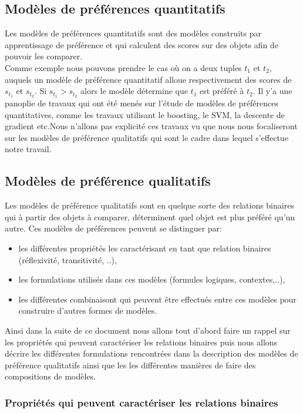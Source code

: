 \documentclass[a4paper,12pt,openany,oneside]{article}
\begin{document}
\subsection{Modèles de préférences quantitatifs} 
Les modèles de préférences quantitatifs sont des modèles construits par apprentissage de préférence et qui calculent des scores sur des objets afin de pouvoir les comparer. \\
Comme exemple nous pouvons prendre le cas où on a deux tuples $t_1$ et $t_2$, auquels un modèle de préférence quantitatif alloue respectivement des scores de $s_{t_1}$ et $s_{t_2}$. Si $s_{t_1}>s_{t_2}$ alors le modèle détermine que $t_1$ est préféré à $t_2$.
Il y'a une panoplie de travaux qui ont été menés sur l'étude de modèles de préférences quantitatives, comme les travaux utilisant le boosting, le SVM, la descente de gradient etc.Nous n'allons pas explicité ces travaux vu que nous nous focaliseront sur les modèles de préférence qualitatifs qui sont le cadre dans lequel s'effectue notre travail.

\subsection{Modèles de préférence qualitatifs}
Les modèles de préférence qualitatifs sont en quelque sorte des relations binaires qui à partir des objets à comparer, déterminent quel objet est plus préféré qu'un autre. Ces modèles de préférences peuvent se distinguer par:
\begin{itemize}
\item les différentes propriétés les caractérisant en tant que relation binaires (réflexivité, transitivité, ..),
\item  les formulations utilisés dans ces modèles (formules logiques, contextes,..),
\item  les différentes combinaisont qui peuvent être effectués entre ces modèles pour construire d'autres formes de modèles.\\
\end{itemize}
 Ainsi dans la suite de ce document nous allons tout d'abord faire un rappel sur les propriétés qui peuvent caractériser les relations binaires puis nous allons décrire les différentes formulations rencontrées dans la description des modèles de préférence qualitatifs ainsi que les les différentes manières de faire des compositions de modèles.

\subsubsection{Propriétés qui peuvent caractériser les relations binaires}
\end{document}

